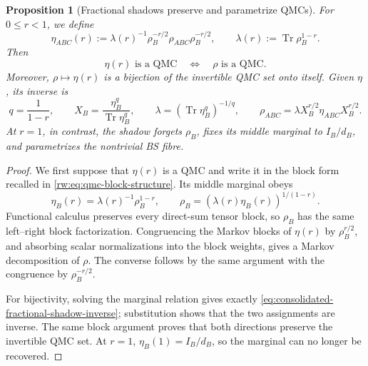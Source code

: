 \documentclass[11pt]{article}
\newtheorem{proposition}[proposition]{Proposition}
\theoremstyle{remark}
\newcommand{\1}{\mathbbm{1}}
\begin{document}
\begin{proposition}[Fractional shadows preserve and parametrize QMCs]
\label{prop:consolidated-fractional-shadow}
For $0\leq r<1$, we define
\begin{equation}
 \eta_{ABC}(r)
 :=\lambda(r)^{-1}
 \rho_B^{-r/2}\rho_{ABC}\rho_B^{-r/2},
 \qquad
 \lambda(r):=\operatorname{Tr}\rho_B^{1-r}.
 \label{eq:consolidated-fractional-shadow}
\end{equation}
Then
\begin{equation}
 \eta(r)\text{ is a QMC}
 \quad\Longleftrightarrow\quad
 \rho\text{ is a QMC}.
 \label{eq:consolidated-fractional-shadow-equivalence}
\end{equation}
Moreover, $\rho\mapsto\eta(r)$ is a bijection of the invertible QMC
set onto itself.  Given $\eta$, its inverse is
\begin{equation}
 q=\frac1{1-r},\qquad
 X_B=\frac{\eta_B^q}{\operatorname{Tr}\eta_B^q},\qquad
 \lambda=(\operatorname{Tr}\eta_B^q)^{-1/q},\qquad
 \rho_{ABC}=\lambda X_B^{r/2}\eta_{ABC}X_B^{r/2}.
 \label{eq:consolidated-fractional-shadow-inverse}
\end{equation}
At $r=1$, in contrast, the shadow forgets $\rho_B$, fixes its
middle marginal to $I_B/d_B$, and parametrizes the nontrivial BS
fibre.
\end{proposition}

\begin{proof}
We first suppose that $\eta(r)$ is a QMC and write it in the block form
recalled in \eqref{rw:eq:qmc-block-structure}.  Its middle marginal
obeys
\begin{equation}
 \eta_B(r)=\lambda(r)^{-1}\rho_B^{1-r},\qquad
 \rho_B=(\lambda(r)\eta_B(r))^{1/(1-r)}.
\end{equation}
Functional calculus preserves every direct-sum tensor block, so
$\rho_B$ has the same left--right block factorization.  Congruencing
the Markov blocks of $\eta(r)$ by $\rho_B^{r/2}$, and absorbing
scalar normalizations into the block weights, gives a Markov
decomposition of $\rho$.  The converse follows by the same argument
with the congruence by $\rho_B^{-r/2}$.

For bijectivity, solving the marginal relation gives exactly
\eqref{eq:consolidated-fractional-shadow-inverse}; substitution shows
that the two assignments are inverse.  The same block argument proves
that both directions preserve the invertible QMC set.  At $r=1$,
$\eta_B(1)=I_B/d_B$, so the marginal can no longer be recovered.
\end{proof}
\end{document}
